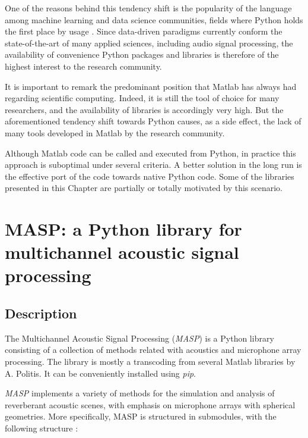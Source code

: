 One of the reasons behind this tendency shift is the popularity of the language among machine learning and data science communities, fields where Python holds the first place by usage \cite{githubblog}. 
Since data-driven paradigms currently conform the state-of-the-art of many applied sciences, including audio signal processing, the availability of convenience Python packages and libraries is therefore of the highest interest to the research community. 

It is important to remark the predominant position that Matlab has always had regarding scientific computing. Indeed, it is still the tool of choice for many researchers, and the availability of libraries is accordingly very high. 
But the aforementioned tendency shift towards Python causes, as a side effect, the lack of many tools developed in Matlab by the research community.

Although Matlab code can be called and executed from Python, in practice this approach is suboptimal under several criteria. A better solution in the long run is the effective port of the code towards native Python code. Some of the libraries presented in this Chapter are partially or totally  motivated by this scenario.

	

\section{MASP: a Python library for multichannel acoustic signal processing}

\subsection{Description}

The Multichannel Acoustic Signal Processing (\textit{MASP}) is a Python library consisting of a collection of methods related with acoustics and microphone array processing.
The library is mostly a transcoding from several Matlab libraries by A. Politis\cite{politis2016microphone, github_politis}. 
It can be conveniently installed using \textit{pip}.

\textit{MASP} implements a variety of methods for the simulation and analysis of reverberant acoustic scenes, with emphasis on microphone arrays with spherical geometries.
More specifically, MASP is structured in submodules, with the following structure :

